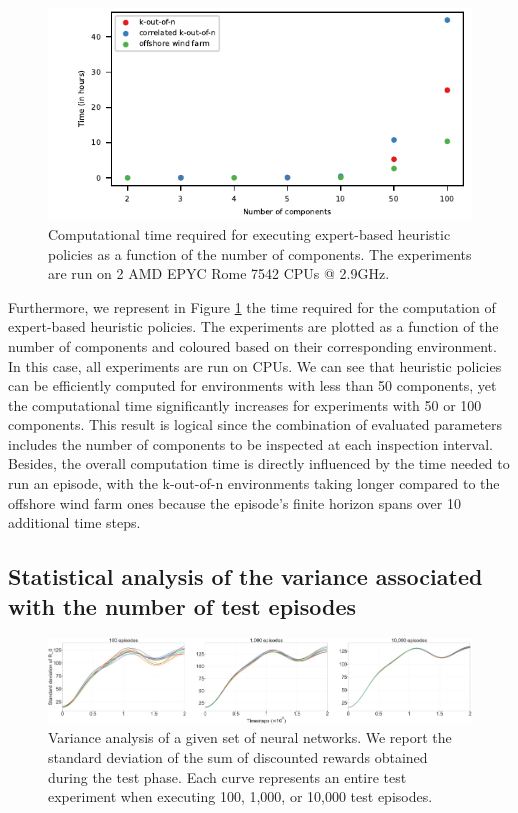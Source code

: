 \begin{figure}
    \centering
    \includegraphics{tex_thesis/figures/ch5/heur_cpu_time.pdf}
    \caption{Computational time required for executing expert-based heuristic policies as a function of the number of components. The experiments are run on 2 AMD EPYC Rome 7542 CPUs @ 2.9GHz.}
    \label{fig:heur_time_cpu}
\end{figure}
Furthermore, we represent in Figure \ref{fig:heur_time_cpu} the time required for the computation of expert-based heuristic policies. The experiments are plotted as a function of the number of components and coloured based on their corresponding environment. In this case, all experiments are run on CPUs. We can see that heuristic policies can be efficiently computed for environments with less than 50 components, yet the computational time significantly increases for experiments with 50 or 100 components. This result is logical since the combination of evaluated parameters includes the number of components to be inspected at each inspection interval. Besides, the overall computation time is directly influenced by the time needed to run an episode, with the k-out-of-n environments taking longer compared to the offshore wind farm ones because the episode's finite horizon spans over 10 additional time steps. 

\subsection{Statistical analysis of the variance associated with the number of test episodes}
\label{app:variance_env}

\begin{figure}
\centering
    \includegraphics[width=\textwidth]{tex_thesis/figures/ch5/variance_analysis.pdf}
\caption{
Variance analysis of a given set of neural networks.
We report the standard deviation of the sum of discounted rewards obtained during the test phase.
Each curve represents an entire test experiment when executing 100, 1,000, or 10,000 test episodes.
}
\label{fig:variance_details}
\end{figure}

